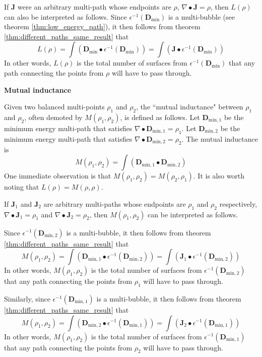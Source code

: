 If \(\mathbf{J}\) were an arbitrary multi-path whose endpoints are \(\rho\), \(\nabla \bullet \mathbf{J} = \rho\), then \(L(\rho)\) can also be interpreted as follows. Since \(\epsilon^{-1}(\mathbf{D}_{\text{min}})\) is a multi-bubble (see theorem \ref{thm:low_energy_path}), it then follows from theorem \ref{thm:different_paths_same_result} that 
\[L(\rho) = \int (\mathbf{D}_{\text{min}} \bullet \epsilon^{-1}(\mathbf{D}_{\text{min}})) = \int (\mathbf{J} \bullet \epsilon^{-1}(\mathbf{D}_{\text{min}}))\]
In other words, \(L(\rho)\) is the total number of surfaces from \(\epsilon^{-1}(\mathbf{D}_{\text{min}})\) that any path connecting the points from \(\rho\) will have to pass through.

\vspace{5mm}

\textbf{Mutual inductance}

Given two balanced multi-points \(\rho_1\) and \(\rho_2\), the ``mutual inductance" between \(\rho_1\) and \(\rho_2\), often demoted by \(M(\rho_1, \rho_2)\), is defined as follows. 
Let \(\mathbf{D}_{\text{min},1}\) be the minimum energy multi-path that satisfies \(\nabla \bullet \mathbf{D}_{\text{min},1} = \rho_1\).
Let \(\mathbf{D}_{\text{min},2}\) be the minimum energy multi-path that satisfies \(\nabla \bullet \mathbf{D}_{\text{min},2} = \rho_2\). 
The mutual inductance is 
\[M(\rho_1, \rho_2) = \int (\mathbf{D}_{\text{min},1} \bullet \mathbf{D}_{\text{min},2})\]
One immediate observation is that \(M(\rho_1, \rho_2) = M(\rho_2, \rho_1)\). It is also worth noting that \(L(\rho) = M(\rho,\rho)\).

If \(\mathbf{J}_1\) and \(\mathbf{J}_2\) are arbitrary multi-paths whose endpoints are \(\rho_1\) and \(\rho_2\) respectively, \(\nabla \bullet \mathbf{J}_1 = \rho_1\) and \(\nabla \bullet \mathbf{J}_2 = \rho_2\), then \(M(\rho_1, \rho_2)\) can be interpreted as follows. 

Since \(\epsilon^{-1}(\mathbf{D}_{\text{min},2})\) is a multi-bubble, it then follows from theorem \ref{thm:different_paths_same_result} that 
\[M(\rho_1, \rho_2) = \int (\mathbf{D}_{\text{min},1} \bullet \epsilon^{-1}(\mathbf{D}_{\text{min},2})) = \int (\mathbf{J}_1 \bullet \epsilon^{-1}(\mathbf{D}_{\text{min},2}))\]
In other words, \(M(\rho_1, \rho_2)\) is the total number of surfaces from \(\epsilon^{-1}(\mathbf{D}_{\text{min},2})\) that any path connecting the points from \(\rho_1\) will have to pass through.

Similarly, since \(\epsilon^{-1}(\mathbf{D}_{\text{min},1})\) is a multi-bubble, it then follows from theorem \ref{thm:different_paths_same_result} that 
\[M(\rho_1, \rho_2) = \int (\mathbf{D}_{\text{min},2} \bullet \epsilon^{-1}(\mathbf{D}_{\text{min},1})) = \int (\mathbf{J}_2 \bullet \epsilon^{-1}(\mathbf{D}_{\text{min},1}))\]
In other words, \(M(\rho_1, \rho_2)\) is the total number of surfaces from \(\epsilon^{-1}(\mathbf{D}_{\text{min},1})\) that any path connecting the points from \(\rho_2\) will have to pass through.

